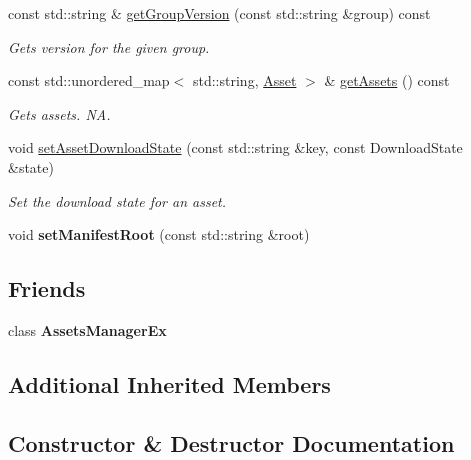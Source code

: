 \begin{DoxyCompactItemize}
const std\+::string \& \hyperlink{classManifest_a6c16730def8fc54b923db36c60af38d7}{get\+Group\+Version} (const std\+::string \&group) const
\begin{DoxyCompactList}\small\item\em Gets version for the given group. \end{DoxyCompactList}\item 
\mbox{\label{classManifest_a66048810727e669af2c8f82284a87cf7}} 
const std\+::unordered\+\_\+map$<$ std\+::string, \hyperlink{structManifest_1_1Asset}{Asset} $>$ \& \hyperlink{classManifest_a66048810727e669af2c8f82284a87cf7}{get\+Assets} () const
\begin{DoxyCompactList}\small\item\em Gets assets.  NA. \end{DoxyCompactList}\item 
void \hyperlink{classManifest_afd94d5f1d587ec8c82cf47ad8b3ea7bf}{set\+Asset\+Download\+State} (const std\+::string \&key, const Download\+State \&state)
\begin{DoxyCompactList}\small\item\em Set the download state for an asset. \end{DoxyCompactList}\item 
\mbox{\label{classManifest_a6de7a2242a6edc55ebb8341d7d8f3873}} 
void {\bfseries set\+Manifest\+Root} (const std\+::string \&root)
\end{DoxyCompactItemize}
\subsection*{Friends}
\begin{DoxyCompactItemize}
\item 
\mbox{\label{classManifest_ab7c03d53ce1728b650be327ea3cd0506}} 
class {\bfseries Assets\+Manager\+Ex}
\end{DoxyCompactItemize}
\subsection*{Additional Inherited Members}


\subsection{Constructor \& Destructor Documentation}
\mbox{\label{classManifest_ab824b9e77f3381d19a7f32db41840da7}} 
